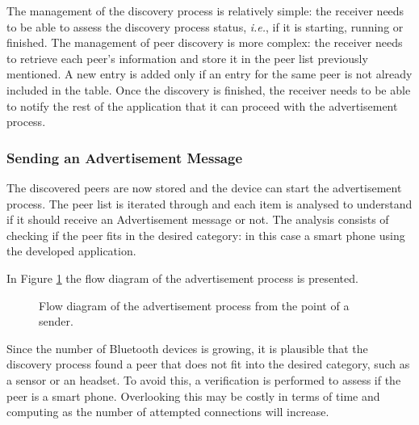 The management of the discovery process is relatively simple: the receiver needs to be able to assess the discovery process status, \textit{i.e.}, if it is starting, running or finished. The management of peer discovery is more complex: the receiver needs to retrieve each peer's information and store it in the peer list previously mentioned. A new entry is added only if an entry for the same peer is not already included in the table. Once the discovery is finished, the receiver needs to be able to notify the rest of the application that it can proceed with the advertisement process.

\subsubsection{Sending an Advertisement Message}
\label{subsubsec:sendadv}

The discovered peers are now stored and the device can start the advertisement process. The peer list is iterated through and each item is analysed to understand if it should receive an Advertisement message or not. The analysis consists of checking if the peer fits in the desired category: in this case a smart phone using the developed application.

In Figure \ref{fig:advflux} the flow diagram of the advertisement process is presented.

\begin{figure}[ht]
	\noindent{}
	\caption{\label{fig:advflux} Flow diagram of the advertisement process from the point of a sender.}
\end{figure}

Since the number of Bluetooth devices is growing, it is plausible that the discovery process found a peer that does not fit into the desired category, such as a sensor or an headset. To avoid this, a verification is performed to assess if the peer is a smart phone. Overlooking this may be costly in terms of time and computing as the number of attempted connections will increase.

